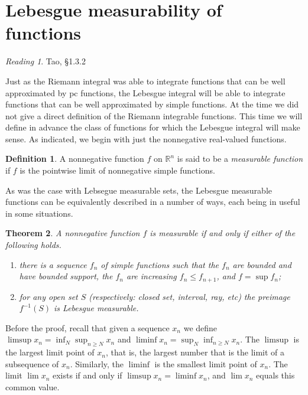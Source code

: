\documentclass[11pt,oneside]{amsbook}
\newcommand{\RR}{{\mathbb R}}
\theoremstyle{definition}
\theoremstyle{plain}
\newtheorem{thm}{Theorem}[section]
\theoremstyle{definition}
\newtheorem{defn}[thm]{Definition}
\theoremstyle{remark}
\newtheorem*{reading}{Reading}
\numberwithin{equation}{section}
\numberwithin{figure}{section}
\begin{document}
\newpage
\section{Lebesgue measurability of functions}

\begin{reading}
  Tao, \S 1.3.2
\end{reading}

Just as the Riemann integral was able to integrate functions that can be well approximated by pc functions, the Lebesgue integral will be able to integrate functions that can be well approximated by simple functions. At the time we did not give a direct definition of the Riemann integrable functions. This time we will define in advance the class of functions for which the Lebesgue integral will make sense. As indicated, we begin with just the nonnegative real-valued functions.

\begin{defn}
  A nonnegative function $f$ on $\RR^n$ is said to be a \emph{measurable function} if $f$ is the pointwise limit of nonnegative simple functions.
\end{defn}

As was the case with Lebsegue measurable sets, the Lebesgue measurable functions can be equivalently described in a number of ways, each being in useful in some situations.

\begin{thm}
  \label{thm:measurable-equiv}
  A nonnegative function $f$ is measurable if and only if either of the following holds.
  \begin{enumerate}
  \item there is a sequence $f_n$ of simple functions such that the $f_n$ are bounded and have bounded support, the $f_n$ are increasing $f_n\leq f_{n+1}$, and $f=\sup f_n$;
  \item for any open set $S$ (respectively: closed set, interval, ray, etc) the preimage $f^{-1}(S)$ is Lebesgue measurable.
  \end{enumerate}
\end{thm}

Before the proof, recall that given a sequence $x_n$ we define $\limsup x_n=\inf_N\sup_{n\geq N}x_n$ and $\liminf x_n=\sup_N\inf_{n\geq N}x_n$. The $\limsup$ is the largest limit point of $x_n$, that is, the largest number that is the limit of a subsequence of $x_n$. Similarly, the $\liminf$ is the smallest limit point of $x_n$. The limit $\lim x_n$ exists if and only if $\limsup x_n=\liminf x_n$, and $\lim x_n$ equals this common value.
\end{document}
